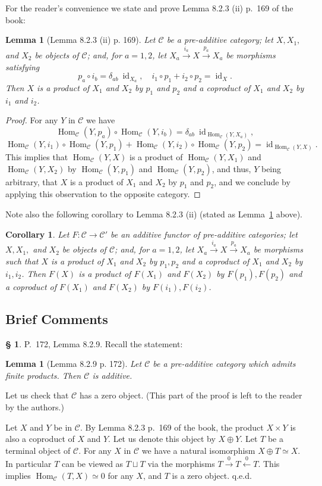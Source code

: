 \documentclass[12pt]{article}%
\newtheorem{lem}[thm]{Lemma}
\newtheorem{cor}[thm]{Corollary}
\theoremstyle{remark}
\theoremstyle{definition}
\newtheorem{s}[thm]{\S}%
\newcommand{\C}{\mathcal C}
\newcommand{\xl}{\xleftarrow}
\newcommand{\xr}{\xrightarrow}
\DeclareMathOperator{\id}{id}
\DeclareMathOperator{\Hom}{Hom}%
\begin{document}
For the reader's convenience we state and prove Lemma 8.2.3 (ii) p.~169 of the book:

\begin{lem}[Lemma 8.2.3 (ii) p. 169]\label{823ii}
Let $\C$ be a pre-additive category; let $X,X_1,$ and $X_2$ be objects of $\C$; and, for $a=1,2$, let $X_a\xr{i_a}X\xr{p_a}X_a$ be morphisms satisfying 
$$
p_a\circ i_b=\delta_{ab}\ \id_{X_a},\quad i_1\circ p_1+i_2\circ p_2=\id_X.
$$
Then $X$ is a product of $X_1$ and $X_2$ by $p_1$ and $p_2$ and a coproduct of $X_1$ and $X_2$ by $i_1$ and $i_2$. 
\end{lem}

\begin{proof}
For any $Y$ in $\C$ we have 
$$
\Hom_\C(Y,p_a)\circ\Hom_\C(Y,i_b)=\delta_{ab}\ \id_{\Hom_\C(Y,X_a)},
$$ 
$$
\Hom_\C(Y,i_1)\circ\Hom_\C(Y,p_1)+\Hom_\C(Y,i_2)\circ\Hom_\C(Y,p_2)=\id_{\Hom_\C(Y,X)}.
$$ 
This implies that $\Hom_\C(Y,X)$ is a product of $\Hom_\C(Y,X_1)$ and $\Hom_\C(Y,X_2)$ by $\Hom_\C(Y,p_1)$ and $\Hom_\C(Y,p_2)$, and thus, $Y$ being arbitrary, that $X$ is a product of $X_1$ and $X_2$ by $p_1$ and $p_2$, and we conclude by applying this observation to the opposite category.
\end{proof}

Note also the following corollary to Lemma 8.2.3 (ii) (stated as Lemma~\ref{823ii} above). 

\begin{cor}\label{823b}
Let $F:\C\to\C'$ be an additive functor of pre-additive categories; let $X,X_1,$ and $X_2$ be objects of $\C$; and, for $a=1,2$, let $X_a\xr{i_a}X\xr{p_a}X_a$ be morphisms such that $X$ is a product of $X_1$ and $X_2$ by $p_1,p_2$ and a coproduct of $X_1$ and $X_2$ by $i_1,i_2$. Then $F(X)$ is a product of $F(X_1)$ and $F(X_2)$ by $F(p_1),F(p_2)$ and a coproduct of $F(X_1)$ and $F(X_2)$ by $F(i_1),F(i_2)$. 
\end{cor}


\subsection{Brief Comments}

\begin{s} 
P.~172, Lemma 8.2.9. Recall the statement:

\begin{lem}[Lemma 8.2.9 p. 172] 
Let $\C$ be a pre-additive category which admits finite products. Then $\C$ is additive.
\end{lem}

Let us check that $\C$ has a zero object. (This part of the proof is left to the reader by the authors.) 

Let $X$ and $Y$ be in $\C$. By Lemma 8.2.3 p.~169 of the book, the product $X\times Y$ is also a coproduct of $X$ and $Y$. Let us denote this object by $X\oplus Y$. Let $T$ be a terminal object of $\C$. For any $X$ in $\C$ we have a natural isomorphism $X\oplus T\simeq X$. In particular $T$ can be viewed as $T\sqcup T$ via the morphisms $T\xr0T\xl0T$. This implies $\Hom_\C(T,X)\simeq0$ for any $X$, and $T$ is a zero object. q.e.d.
\end{s}
\end{document}
